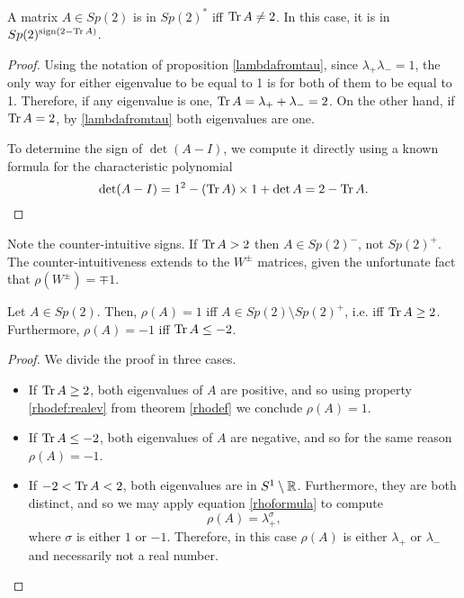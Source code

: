 \begin{corollary}\label{sp2sgn}
A matrix $A \in Sp(2)$ is in $Sp(2)^*$ iff $\operatorname{Tr} A \neq 2$. In this case, it is in $Sp(2)^{\operatorname{sign}(2 - \operatorname{Tr} A)}$.
\end{corollary}

\begin{proof}
Using the notation of proposition \ref{lambdafromtau}, since $\lambda_+ \lambda_- = 1$, the only way for either eigenvalue to be equal to 1 is for both of them to be equal to 1. Therefore, if any eigenvalue is one, $\operatorname{Tr} A = \lambda_+ + \lambda_- = 2$. On the other hand, if $\operatorname{Tr} A = 2$, by \eqref{lambdafromtau} both eigenvalues are one.

To determine the sign of $\det(A-I)$, we compute it directly using a known formula for the characteristic polynomial
\begin{equation}
\det(A-I) = 1^2 - (\operatorname{Tr} A) \times 1 + \det A = 2 - \operatorname{Tr} A.
\end{equation}
\end{proof}

\begin{remark}
Note the counter-intuitive signs. If $\operatorname{Tr} A > 2$ then $A \in Sp(2)^-$, not $Sp(2)^+$. The counter-intuitiveness extends to the $W^\pm$ matrices, given the unfortunate fact that $\rho(W^\pm) = \mp 1$.
\end{remark}

\begin{corollary}\label{sp2pm}
Let $A \in Sp(2)$. Then, $\rho(A) = 1$ iff $A \in Sp(2) \setminus Sp(2)^+$, i.e. iff $\operatorname{Tr} A \geq 2$. Furthermore, $\rho(A) = -1$ iff $\operatorname{Tr} A \leq -2$.
\end{corollary}

\begin{proof}
We divide the proof in three cases.
\begin{itemize}
\item If $\operatorname{Tr} A \geq 2$, both eigenvalues of $A$ are positive, and so using property \ref{rhodef:realev} from theorem \ref{rhodef} we conclude $\rho(A) = 1$.
\item If $\operatorname{Tr} A \leq -2$, both eigenvalues of $A$ are negative, and so for the same reason $\rho(A) = -1$.
\item If $-2 < \operatorname{Tr} A < 2$, both eigenvalues are in $S^1 \setminus \mathbb{R}$. Furthermore, they are both distinct, and so we may apply equation \eqref{rhoformula} to compute
\begin{equation}\label{sp2pm:3}
\rho(A) = \lambda_+^\sigma,
\end{equation}
where $\sigma$ is either $1$ or $-1$. Therefore, in this case $\rho(A)$ is either $\lambda_+$ or $\lambda_-$ and necessarily not a real number.
\end{itemize}
\end{proof}

